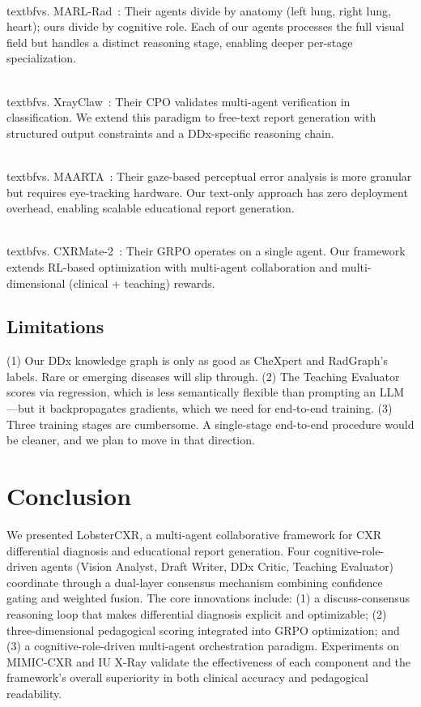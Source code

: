 \documentclass[runningheads,10pt]{llncs}
\begin{document}
\\textbf{vs. MARL-Rad~\cite{marlrad}:} Their agents divide by anatomy (left lung, right lung, heart); ours divide by cognitive role. Each of our agents processes the full visual field but handles a distinct reasoning stage, enabling deeper per-stage specialization.

\\textbf{vs. XrayClaw~\cite{xrayclaw}:} Their CPO validates multi-agent verification in classification. We extend this paradigm to free-text report generation with structured output constraints and a DDx-specific reasoning chain.

\\textbf{vs. MAARTA~\cite{maarta}:} Their gaze-based perceptual error analysis is more granular but requires eye-tracking hardware. Our text-only approach has zero deployment overhead, enabling scalable educational report generation.

\\textbf{vs. CXRMate-2~\cite{cxrmate2}:} Their GRPO operates on a single agent. Our framework extends RL-based optimization with multi-agent collaboration and multi-dimensional (clinical + teaching) rewards.

\subsection{Limitations}

(1) Our DDx knowledge graph is only as good as CheXpert and RadGraph's labels. Rare or emerging diseases will slip through. (2) The Teaching Evaluator scores via regression, which is less semantically flexible than prompting an LLM---but it backpropagates gradients, which we need for end-to-end training. (3) Three training stages are cumbersome. A single-stage end-to-end procedure would be cleaner, and we plan to move in that direction.

\section{Conclusion}

We presented LobsterCXR, a multi-agent collaborative framework for CXR differential diagnosis and educational report generation. Four cognitive-role-driven agents (Vision Analyst, Draft Writer, DDx Critic, Teaching Evaluator) coordinate through a dual-layer consensus mechanism combining confidence gating and weighted fusion. The core innovations include: (1) a discuss-consensus reasoning loop that makes differential diagnosis explicit and optimizable; (2) three-dimensional pedagogical scoring integrated into GRPO optimization; and (3) a cognitive-role-driven multi-agent orchestration paradigm. Experiments on MIMIC-CXR and IU X-Ray validate the effectiveness of each component and the framework's overall superiority in both clinical accuracy and pedagogical readability.
\end{document}
